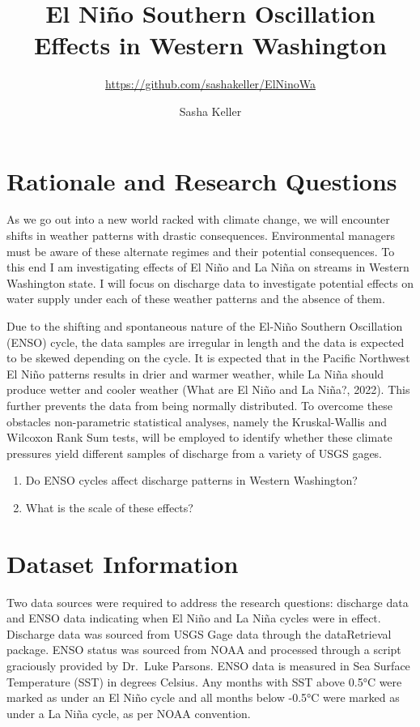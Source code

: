 \documentclass[
  12pt,
]{article}
\title{El Niño Southern Oscillation Effects in Western Washington}
\subtitle{\url{https://github.com/sashakeller/ElNinoWa}}
\author{Sasha Keller}
\date{}
\providecommand{\tightlist}{%
  \setlength{\itemsep}{0pt}\setlength{\parskip}{0pt}}
\begin{document}
\maketitle

\newpage

\hypertarget{rationale-and-research-questions}{%
\section{Rationale and Research
Questions}\label{rationale-and-research-questions}}

As we go out into a new world racked with climate change, we will
encounter shifts in weather patterns with drastic consequences.
Environmental managers must be aware of these alternate regimes and
their potential consequences. To this end I am investigating effects of
El Niño and La Niña on streams in Western Washington state. I will focus
on discharge data to investigate potential effects on water supply under
each of these weather patterns and the absence of them.

Due to the shifting and spontaneous nature of the El-Niño Southern
Oscillation (ENSO) cycle, the data samples are irregular in length and
the data is expected to be skewed depending on the cycle. It is expected
that in the Pacific Northwest El Niño patterns results in drier and
warmer weather, while La Niña should produce wetter and cooler weather
(What are El Niño and La Niña?, 2022). This further prevents the data
from being normally distributed. To overcome these obstacles
non-parametric statistical analyses, namely the Kruskal-Wallis and
Wilcoxon Rank Sum tests, will be employed to identify whether these
climate pressures yield different samples of discharge from a variety of
USGS gages.

\begin{enumerate}
\def\labelenumi{\arabic{enumi}.}
\tightlist
\item
  Do ENSO cycles affect discharge patterns in Western Washington?
\item
  What is the scale of these effects?
\end{enumerate}

\newpage

\hypertarget{dataset-information}{%
\section{Dataset Information}\label{dataset-information}}

Two data sources were required to address the research questions:
discharge data and ENSO data indicating when El Niño and La Niña cycles
were in effect. Discharge data was sourced from USGS Gage data through
the dataRetrieval package. ENSO status was sourced from NOAA and
processed through a script graciously provided by Dr.~Luke Parsons. ENSO
data is measured in Sea Surface Temperature (SST) in degrees Celsius.
Any months with SST above 0.5°C were marked as under an El Niño cycle
and all months below -0.5°C were marked as under a La Niña cycle, as per
NOAA convention.
\end{document}

